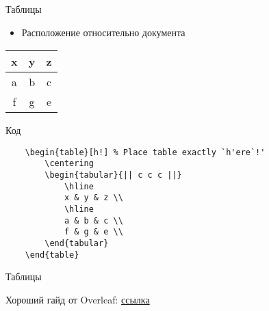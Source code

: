 \begin{frame}[fragile]{Таблицы}

\begin{itemize}
    \item Расположение относительно документа
\end{itemize}

\begin{table}[h!] %
    \centering
    \begin{tabular}{|| c c c ||} 
        \hline
        x & y & z \\
        \hline
        a & b & c \\
        f & g & e \\
    \end{tabular}
\end{table}

\vspace{-0.5cm}

\begin{block}{Код}
    \begin{lstlisting}
    \begin{table}[h!] % Place table exactly `h'ere`!'
        \centering
        \begin{tabular}{|| c c c ||} 
            \hline
            x & y & z \\
            \hline
            a & b & c \\
            f & g & e \\
        \end{tabular}
    \end{table}
    \end{lstlisting}
\end{block}

\end{frame}



\begin{frame}[fragile]{Таблицы}

Хороший гайд от Overleaf: 
\href{https://www.overleaf.com/learn/latex/Tables}{\color{blue} ссылка}

\end{frame}

